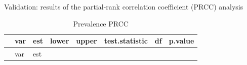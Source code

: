 \documentclass[
]{article}
\begin{document}
Validation: results of the partial-rank correlation coefficient (PRCC)
analysis

\begin{longtable}[]{@{}
  >{\raggedright\arraybackslash}p{}
  >{\raggedright\arraybackslash}p{}
  >{\raggedleft\arraybackslash}p{}
  >{\raggedleft\arraybackslash}p{}
  >{\raggedleft\arraybackslash}p{}
  >{\raggedleft\arraybackslash}p{}
  >{\raggedleft\arraybackslash}p{}
  >{\raggedleft\arraybackslash}p{}@{}}
\caption{Prevalence PRCC}\tabularnewline
\toprule\noalign{}
\begin{minipage}[b]{\linewidth}\raggedright
\end{minipage} & \begin{minipage}[b]{\linewidth}\raggedright
var
\end{minipage} & \begin{minipage}[b]{\linewidth}\raggedleft
est
\end{minipage} & \begin{minipage}[b]{\linewidth}\raggedleft
lower
\end{minipage} & \begin{minipage}[b]{\linewidth}\raggedleft
upper
\end{minipage} & \begin{minipage}[b]{\linewidth}\raggedleft
test.statistic
\end{minipage} & \begin{minipage}[b]{\linewidth}\raggedleft
df
\end{minipage} & \begin{minipage}[b]{\linewidth}\raggedleft
p.value
\end{minipage} \\
\midrule\noalign{}
\endfirsthead
\toprule\noalign{}
\begin{minipage}[b]{\linewidth}\raggedright
\end{minipage} & \begin{minipage}[b]{\linewidth}\raggedright
var
\end{minipage} & \begin{minipage}[b]{\linewidth}\raggedleft
est
\end{minipage} & \begin{minipage}[b]{\linewidth}\raggedleft

\end{minipage}
\end{longtable}
\end{document}
